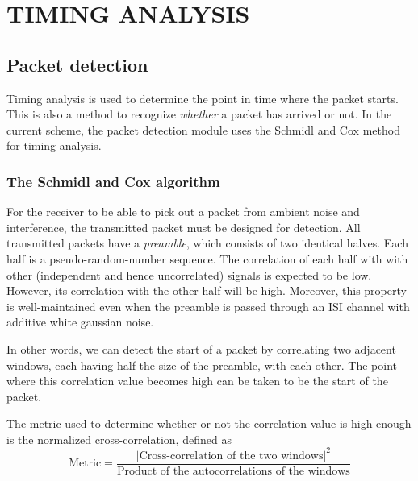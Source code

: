 \chapter{TIMING ANALYSIS}
\label{chap:timing}


\section{Packet detection}

Timing analysis is used to determine the point in time where the packet starts.
This is also a method to recognize \emph{whether} a packet has arrived or not.
In the current scheme, the packet detection module uses the Schmidl and Cox %
method for timing analysis.

\subsection{The Schmidl and Cox algorithm}

For the receiver to be able to pick out a packet from ambient noise and
interference, the transmitted packet must be designed for detection. All
transmitted packets have a \emph{preamble}, which consists of two identical
halves. Each half is a pseudo-random-number sequence. The correlation of each
half with with other (independent and hence uncorrelated) signals is expected
to be low. However, its correlation with the other half will be high. Moreover,
this property is well-maintained even when the preamble is passed through an
ISI channel with additive white gaussian noise.

In other words, we can detect the start of a packet by correlating two adjacent
windows, each having half the size of the preamble, with each other. The point
where this correlation value becomes high can be taken to be the start of the
packet.


The metric used to determine whether or not the correlation value is high
enough is the normalized cross-correlation, defined as
$$ \text{Metric} = \frac{|\text{Cross-correlation of the two windows}|^2}
                        {\text{Product of the autocorrelations of the windows}}
$$


